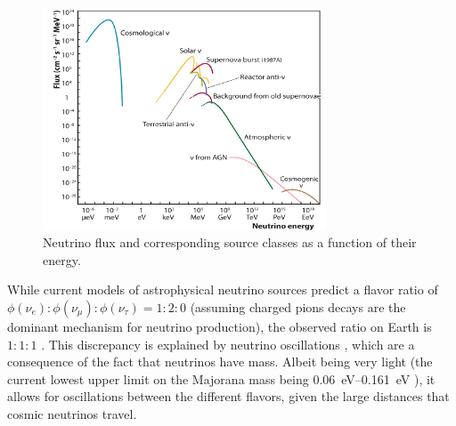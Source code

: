 \begin{figure}
  \centering
  \includegraphics[width=0.75\textwidth]{content/plots/halftime/neutrinos-energy.png}
  \caption{
    Neutrino flux and corresponding source classes as a function of their energy.
    \cite{spiering2012} %
  }
  \label{fig:neutrinos:flux_spectrum}
\end{figure}


While current models of astrophysical neutrino sources predict a flavor ratio of
  $\phi(\nu_e) : \phi(\nu_\mu) : \phi(\nu_\tau) = 1 : 2 : 0$
    (assuming charged pions decays are the dominant mechanism for neutrino production),
the observed ratio on Earth is
  $1 : 1 : 1$ \cite{neutrinos_beacom}.
This discrepancy is explained by neutrino oscillations \cite{neutrinos_beacom},
  which are a consequence of the fact that neutrinos have mass.
Albeit being very light
  (the current lowest upper limit on the Majorana mass being \qtyrange{0.06}{0.161}{\electronvolt} \cite{neutrinos_gando}),
  it allows for oscillations between the different flavors,
    given the large distances that cosmic neutrinos travel.
